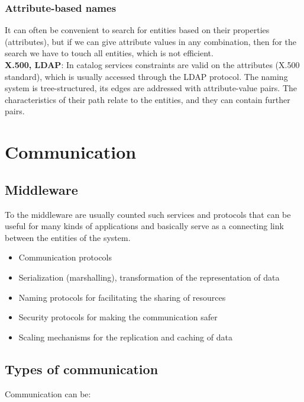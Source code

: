 \documentclass[margin=0px]{article}
\begin{document}
\subsubsection{Attribute-based names}

It can often be convenient to search for entities based on their properties (attributes), but if we can give attribute values
in any combination, then for the search we have to touch all entities, which
is not efficient. \\

\noindent \textbf{X.500, LDAP}: In catalog services constraints are valid on the attributes (X.500 standard), which is usually
accessed through the LDAP protocol. The naming system is tree-structured, its edges are addressed with attribute-value pairs.
The characteristics of their path relate to the entities, and they can contain further pairs.

\section{Communication}

\subsection{Middleware}

To the middleware are usually counted such services and protocols that can be useful for many kinds of
applications and basically serve as a connecting link between the entities of the system.

\begin{itemize}
    \item	Communication protocols
    \item	Serialization (marshalling), transformation of the representation of data
    \item	Naming protocols for facilitating the sharing of resources
    \item	Security protocols for making the communication safer
    \item	Scaling mechanisms for the replication and caching of data
\end{itemize}

\subsection{Types of communication}

Communication can be:
\end{document}
